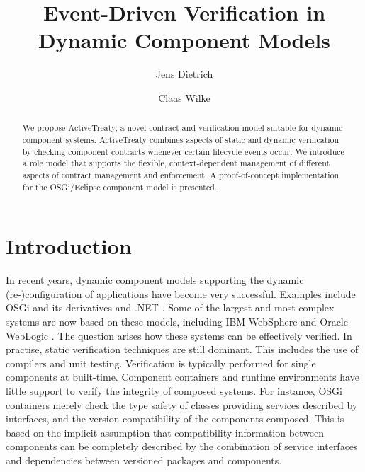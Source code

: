 \documentclass{llncs}
\begin{document}
\title{Event-Driven Verification in Dynamic Component Models}

\author{Jens Dietrich \and Claas Wilke}


\maketitle



\begin{abstract}

We propose ActiveTreaty, a novel contract and verification model suitable for dynamic component systems. ActiveTreaty combines aspects of static and dynamic verification by checking component contracts whenever certain lifecycle events occur. We introduce a role model that supports the flexible, context-dependent management of different aspects of contract management and enforcement. 
A proof-of-concept implementation for the OSGi/Eclipse component model is presented. 

\end{abstract}



\section{Introduction}

In recent years, dynamic component models supporting the dynamic (re-)configuration of applications have become very successful. Examples include OSGi \cite{OSGI} and its derivatives and .NET \cite{TODO}. Some of the largest and most complex systems are now based on these models, including IBM WebSphere \cite{TODO} and Oracle WebLogic \cite{TODO}. The question arises how these systems can be effectively verified. In practise, static verification techniques are still dominant. This includes the use of compilers and unit testing. Verification is typically performed for single components at built-time. Component containers and runtime environments have little support to verify the integrity of composed systems. For instance, OSGi containers merely check the type safety of classes providing services described by interfaces, and the version compatibility of the components composed. This is based on the implicit assumption that compatibility information between components can be completely described by the combination of service interfaces and dependencies between versioned packages and components. 
\end{document}
